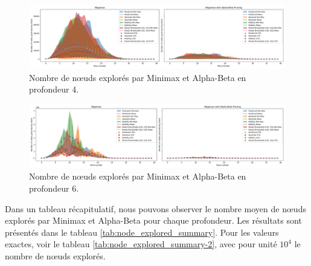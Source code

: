 \begin{figure}[H]
    \centering
    \includegraphics[width=\textwidth]{ressources/Number of nodes generated by Black_depth_4_combined.png}
    \caption{Nombre de nœuds explorés par Minimax et Alpha-Beta en profondeur 4.}
    \label{fig:complexity_node_explored-4}
\end{figure}

\begin{figure}[H]
    \centering
    \includegraphics[width=\textwidth]{ressources/Number of nodes generated by Black_depth_6_combined.png}
    \caption{Nombre de nœuds explorés par Minimax et Alpha-Beta en profondeur 6.}
    \label{fig:complexity_node_explored-6}
\end{figure}

Dans un tableau récapitulatif, nous pouvons observer le nombre moyen de nœuds explorés par Minimax et Alpha-Beta pour chaque profondeur. Les résultats sont présentés dans le tableau \ref{tab:node_explored_summary}. Pour les valeurs exactes, voir le tableau \ref{tab:node_explored_summary-2}, avec pour unité $10^4$ le nombre de nœuds explorés.

